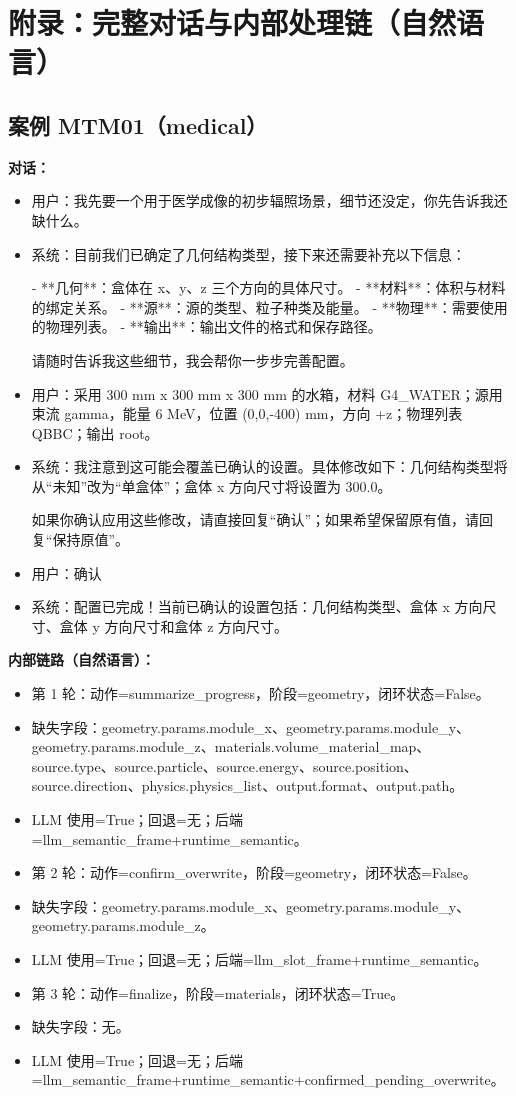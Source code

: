 \documentclass[11pt]{ctexart}
\begin{document}
\section{附录：完整对话与内部处理链（自然语言）}
\subsection{案例 MTM01（medical）}
\textbf{对话：}
\begin{itemize}
\item 用户：我先要一个用于医学成像的初步辐照场景，细节还没定，你先告诉我还缺什么。
\item 系统：目前我们已确定了几何结构类型，接下来还需要补充以下信息：

- **几何**：盒体在 x、y、z 三个方向的具体尺寸。
- **材料**：体积与材料的绑定关系。
- **源**：源的类型、粒子种类及能量。
- **物理**：需要使用的物理列表。
- **输出**：输出文件的格式和保存路径。

请随时告诉我这些细节，我会帮你一步步完善配置。
\item 用户：采用 300 mm x 300 mm x 300 mm 的水箱，材料 G4\_WATER；源用束流 gamma，能量 6 MeV，位置 (0,0,-400) mm，方向 +z；物理列表 QBBC；输出 root。
\item 系统：我注意到这可能会覆盖已确认的设置。具体修改如下：几何结构类型将从“未知”改为“单盒体”；盒体 x 方向尺寸将设置为 300.0。

如果你确认应用这些修改，请直接回复“确认”；如果希望保留原有值，请回复“保持原值”。
\item 用户：确认
\item 系统：配置已完成！当前已确认的设置包括：几何结构类型、盒体 x 方向尺寸、盒体 y 方向尺寸和盒体 z 方向尺寸。
\end{itemize}
\textbf{内部链路（自然语言）：}
\begin{itemize}
\item 第 1 轮：动作=summarize\_progress，阶段=geometry，闭环状态=False。
\item 缺失字段：geometry.params.module\_x、geometry.params.module\_y、geometry.params.module\_z、materials.volume\_material\_map、source.type、source.particle、source.energy、source.position、source.direction、physics.physics\_list、output.format、output.path。
\item LLM 使用=True；回退=无；后端=llm\_semantic\_frame+runtime\_semantic。
\item 第 2 轮：动作=confirm\_overwrite，阶段=geometry，闭环状态=False。
\item 缺失字段：geometry.params.module\_x、geometry.params.module\_y、geometry.params.module\_z。
\item LLM 使用=True；回退=无；后端=llm\_slot\_frame+runtime\_semantic。
\item 第 3 轮：动作=finalize，阶段=materials，闭环状态=True。
\item 缺失字段：无。
\item LLM 使用=True；回退=无；后端=llm\_semantic\_frame+runtime\_semantic+confirmed\_pending\_overwrite。
\end{itemize}
\end{document}
